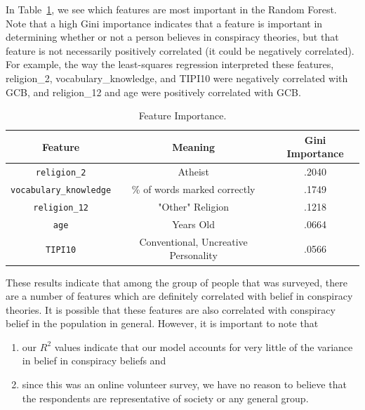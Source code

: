 \documentclass[11pt]{article}
\begin{document}
In Table~\ref{tab:gini}, we see which features are most important in the
Random Forest. Note that a high Gini importance indicates that a feature
is important in determining whether or not a person believes in
conspiracy theories, but that feature is not necessarily positively
correlated (it could be negatively correlated). For example, the way the least-squares
regression interpreted these features, religion\_2,
vocabulary\_knowledge, and TIPI10 were negatively correlated with GCB, and
religion\_12 and age were positively correlated with GCB.

\begin{table}[ht]
	\centering
	\caption{Feature Importance.} \label{tab:gini}
	\vspace{1mm}
\begin{tabular}{ |c|c|c| } 
   \hline
   Feature & Meaning & Gini Importance \\ 
   \hline
   \verb|religion_2| & Atheist & .2040 \\ 
   \verb|vocabulary_knowledge| & \% of words marked correctly & .1749 \\ 
   \verb|religion_12| & "Other" Religion & .1218 \\ 
   \verb|age| & Years Old & .0664 \\ 
   \verb|TIPI10| & Conventional, Uncreative Personality & .0566 \\ 
   \hline
\end{tabular}
\end{table}

These results indicate that among the group of people that was
surveyed, there are a number of features which are definitely correlated
with belief in conspiracy theories. It is possible
that these features are also correlated with conspiracy
belief in the population in general. However, it is important to note
that 
\begin{enumerate}
\item our \(R^2\) values indicate that our model accounts for very
little of the variance in belief in conspiracy beliefs and 
\item since this was
an online volunteer survey, we have no reason to believe that the
respondents are representative of society or any general group.
\end{enumerate}
\end{document}
